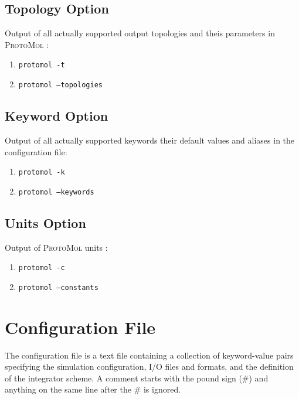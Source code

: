 \documentclass[11pt]{report}
\newcommand{\ProtoMol}{\textsc{ProtoMol }}
\providecommand{\ttsmall}[1]{\texttt{\small\mbox{#1}}}
\begin{document}
\subsection{Topology Option}

Output of all actually supported output topologies and theis
parameters in \ProtoMol : \\ 
\begin{enumerate}
\item \ttsmall{protomol -t} 
\item \ttsmall{protomol --topologies} 
\end{enumerate}

\subsection{Keyword Option}

Output of all actually supported keywords their default values and
aliases in the configuration file: \\ 
\begin{enumerate}
\item \ttsmall{protomol -k} 
\item \ttsmall{protomol --keywords} 
\end{enumerate}

\subsection{Units Option}

Output of \ProtoMol units : \\ 
\begin{enumerate}
\item \ttsmall{protomol -c} 
\item \ttsmall{protomol --constants} 
\end{enumerate}


\section{Configuration File}

The configuration file is a text file containing a collection of
keyword-value pairs specifying the simulation configuration, I/O files
and formats, and the definition of the integrator scheme. A comment
starts with the pound
sign (\#) and anything on the same line after the \# is ignored.
\end{document}
